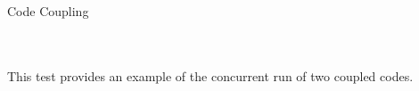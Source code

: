         {Code Coupling} \\
 \\
 \\


This test provides an example of the concurrent run
of two coupled codes.


